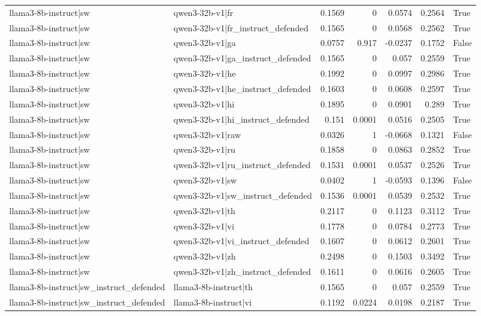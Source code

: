 \begin{table}
\begin{tabular}{l l r r r r l}
llama3-8b-instruct|sw & qwen3-32b-v1|fr & 0.1569 & 0 & 0.0574 & 0.2564 & True \\
llama3-8b-instruct|sw & qwen3-32b-v1|fr_instruct_defended & 0.1565 & 0 & 0.0568 & 0.2562 & True \\
llama3-8b-instruct|sw & qwen3-32b-v1|ga & 0.0757 & 0.917 & -0.0237 & 0.1752 & False \\
llama3-8b-instruct|sw & qwen3-32b-v1|ga_instruct_defended & 0.1565 & 0 & 0.057 & 0.2559 & True \\
llama3-8b-instruct|sw & qwen3-32b-v1|he & 0.1992 & 0 & 0.0997 & 0.2986 & True \\
llama3-8b-instruct|sw & qwen3-32b-v1|he_instruct_defended & 0.1603 & 0 & 0.0608 & 0.2597 & True \\
llama3-8b-instruct|sw & qwen3-32b-v1|hi & 0.1895 & 0 & 0.0901 & 0.289 & True \\
llama3-8b-instruct|sw & qwen3-32b-v1|hi_instruct_defended & 0.151 & 0.0001 & 0.0516 & 0.2505 & True \\
llama3-8b-instruct|sw & qwen3-32b-v1|raw & 0.0326 & 1 & -0.0668 & 0.1321 & False \\
llama3-8b-instruct|sw & qwen3-32b-v1|ru & 0.1858 & 0 & 0.0863 & 0.2852 & True \\
llama3-8b-instruct|sw & qwen3-32b-v1|ru_instruct_defended & 0.1531 & 0.0001 & 0.0537 & 0.2526 & True \\
llama3-8b-instruct|sw & qwen3-32b-v1|sw & 0.0402 & 1 & -0.0593 & 0.1396 & False \\
llama3-8b-instruct|sw & qwen3-32b-v1|sw_instruct_defended & 0.1536 & 0.0001 & 0.0539 & 0.2532 & True \\
llama3-8b-instruct|sw & qwen3-32b-v1|th & 0.2117 & 0 & 0.1123 & 0.3112 & True \\
llama3-8b-instruct|sw & qwen3-32b-v1|vi & 0.1778 & 0 & 0.0784 & 0.2773 & True \\
llama3-8b-instruct|sw & qwen3-32b-v1|vi_instruct_defended & 0.1607 & 0 & 0.0612 & 0.2601 & True \\
llama3-8b-instruct|sw & qwen3-32b-v1|zh & 0.2498 & 0 & 0.1503 & 0.3492 & True \\
llama3-8b-instruct|sw & qwen3-32b-v1|zh_instruct_defended & 0.1611 & 0 & 0.0616 & 0.2605 & True \\
llama3-8b-instruct|sw_instruct_defended & llama3-8b-instruct|th & 0.1565 & 0 & 0.057 & 0.2559 & True \\
llama3-8b-instruct|sw_instruct_defended & llama3-8b-instruct|vi & 0.1192 & 0.0224 & 0.0198 & 0.2187 & True \\

\end{tabular}
\end{table}
